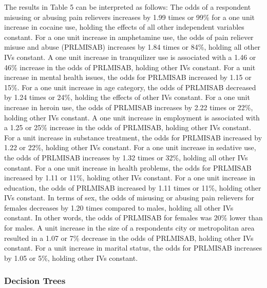 \documentclass[sigconf]{acmart}
\begin{document}
The results in Table 5 can be interpreted as follows: The odds of a respondent 
misusing or abusing pain relievers increases by 1.99 times or 99\% for a one 
unit increase in cocaine use, holding the effects of all other independent 
variables constant. For a one unit increase in amphetamine use, the odds of 
pain reliever misuse and abuse (PRLMISAB) increases by 1.84 times or 84\%, 
holding all other IVs constant. A one unit increase in tranquilizer use is 
associated with a 1.46 or 46\% increase in the odds of PRLMISAB, holding other 
IVs constant. For a unit increase in mental health issues, the odds for 
PRLMISAB increased by 1.15 or 15\%. For a one unit increase in age category, 
the odds of PRLMISAB decreased by 1.24 times or 24\%, holding the effects of 
other IVs constant. For a one unit increase in heroin use, the odds of 
PRLMISAB increases by 2.22 times or 22\%, holding other IVs constant. A one 
unit increase in employment is associated with a 1.25 or 25\% increase in the 
odds of PRLMISAB, holding other IVs constant. For a unit increase in substance 
treatment, the odds for PRLMISAB increased by 1.22 or 22\%, holding other IVs 
constant. For a one unit increase in sedative use, the odds of PRLMISAB 
increases by 1.32 times or 32\%, holding all other IVs constant. For a one 
unit increase in health problems, the odds for PRLMISAB increased by 1.11 or
11\%, holding other IVs constant. For a one unit increase in education, the 
odds of PRLMISAB increased by 1.11 times or 11\%, holding other IVs constant. 
In terms of sex, the odds of misusing or abusing pain relievers for females 
decreases by 1.20 times compared to males, holding all other IVs constant. 
In other words, the odds of PRLMISAB for females was 20\% lower than for males. 
A unit increase in the size of a respondents city or metropolitan area 
resulted in a 1.07 or 7\% decrease in the odds of PRLMISAB, holding other 
IVs constant. For a unit increase in marital status, the odds for PRLMISAB 
increases by 1.05 or 5\%, holding other IVs constant. 
 

\subsubsection{Decision Trees} 
\end{document}
